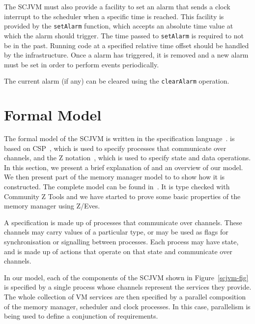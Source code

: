 \documentclass[a4paper,10pt]{report}
\begin{document}
The SCJVM must also provide a facility to set an alarm that sends a clock
interrupt to the scheduler when a specific time is reached. This facility is
provided by the \texttt{set\-Alarm} function, which accepts an absolute time
value at which the alarm should trigger. The time passed to \texttt{set\-Alarm}
is required to not be in the past. Running code at a specified relative time
offset should be handled by the infrastructure. Once a alarm has triggered, it
is removed and a new alarm must be set in order to perform events periodically.

The current alarm (if any) can be cleared using the \texttt{clear\-Alarm}
operation.

\section{Formal Model}
\label{formal-model-section}

The formal model of the SCJVM is written in the \Circus{} specification
language~\cite{oliveira2009}. \Circus{} is based on CSP~\cite{roscoe2011}, which
is used to specify processes that communicate over channels, and the Z
notation~\cite{woodcock1996}, which is used to specify state and data
operations. In this section, we present a brief explanation of \Circus{} and an
overview of our model. We then present part of the memory manager model to to
show how it is constructed. The complete model can be found
in~\cite{baxter2015}. It is type checked with Community Z Tools and we have
started to prove some basic properties of the memory manager using Z/Eves.

A \Circus{} specification is made up of processes that communicate over
channels.  These channels may carry values of a particular type, or may be used
as flags for synchronisation or signalling between processes.  Each process may
have state, and is made up of actions that operate on that state and communicate
over channels.

In our model, each of the components of the SCJVM shown in
Figure~\ref{scjvm-fig} is specified by a single process whose channels represent
the services they provide.  The whole collection of VM services are then
specified by a parallel composition of the memory manager, scheduler and clock
processes. In this case, parallelism is being used to define a conjunction of
requirements. 
\end{document}
